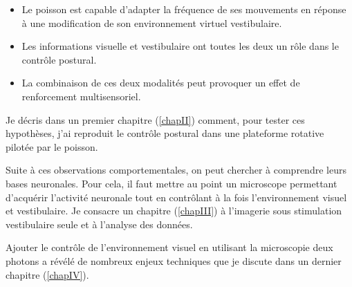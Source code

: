\begin{itemize}
  \item Le poisson est capable d'adapter la fréquence de ses mouvements en réponse à une modification de son environnement virtuel vestibulaire.
  \item Les informations visuelle et vestibulaire ont toutes les deux un rôle dans le contrôle postural.
  \item La combinaison de ces deux modalités peut provoquer un effet de renforcement multisensoriel.
\end{itemize}
  
Je décris dans un premier chapitre (\ref{chapII}) comment, pour tester ces hypothèses, j'ai reproduit le contrôle postural dans une plateforme rotative pilotée par le poisson.

Suite à ces observations comportementales, on peut chercher à comprendre leurs bases neuronales. Pour cela, il faut mettre au point un microscope permettant d'acquérir l'activité neuronale tout en contrôlant à la fois l'environnement visuel et vestibulaire. Je consacre un chapitre (\ref{chapIII}) à l'imagerie sous stimulation vestibulaire seule et à l'analyse des données.

Ajouter le contrôle de l'environnement visuel en utilisant la microscopie deux photons a révélé de nombreux enjeux techniques que je discute dans un dernier chapitre (\ref{chapIV}).
